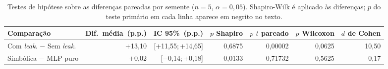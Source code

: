\begin{table}[t]
\centering
\caption{Testes de hipótese sobre as diferenças pareadas por semente
($n{=}5$, $\alpha{=}0{,}05$). Shapiro-Wilk é aplicado às diferenças;
$p$ do teste primário em cada linha aparece em negrito no texto.}
\label{tab:testes}
\begin{tabular}{@{}lrrrrrr@{}}
\toprule
\textbf{Comparação} & \textbf{Dif.\ média}~(p.p.) & \textbf{IC 95\%}~(p.p.) &
\textbf{$p$ Shapiro} & \textbf{$p$ $t$ pareado} & \textbf{$p$ Wilcoxon} &
\textbf{$d$ de Cohen} \\
\midrule
Com \textit{leak.} $-$ Sem \textit{leak.} & $+$13,10 & [$+$11,55;\,$+$14,65] & 0,6875 & 0,00002 & 0,0625 & 10,50 \\
Simbólica $-$ MLP puro & $+$0,02 & [$-$0,14;\,$+$0,18] & 0,0133 & 0,71732 & 0,5625 & 0,17 \\
\bottomrule
\end{tabular}
\end{table}
